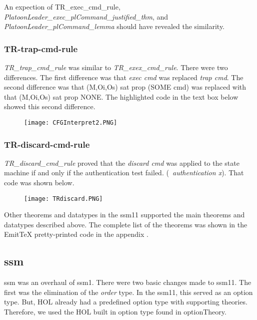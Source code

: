  An expection of TR_exec_cmd_rule, \textit{PlatoonLeader_exec_plCommand_justified_thm},
 and \textit{PlatoonLeader_plCommand_lemma} should have revealed the similarity.\\
 
 
\subsubsection{TR-trap-cmd-rule}
\label{sec:tr-trap-cmd}


  \textit{TR_trap_cmd_rule} was similar to \textit{TR_exex_cmd_rule}.  There were two differences.
  The first difference was that \textit{exec cmd} was replaced \textit{trap cmd}.  The second difference
  was that (M,Oi,Os) sat prop (SOME cmd) was replaced with that (M,Oi,Os) sat prop  NONE.  The
  highlighted code in the text box below showed this second difference.\\
  
  \begin{figure}[h]
  \centering
  \texttt{[image: CFGInterpret2.PNG]}
\end{figure}


\subsubsection{TR-discard-cmd-rule}
\label{sec:tr-discard-cmd}

  \textit{TR_discard_cmd_rule} proved that the \textit{discard cmd} was applied to the state machine
  if and only if the authentication test failed.  (\textit{~authentication x}).  That code was shown below.\\
  
  \begin{figure}[h]
  \centering
  \texttt{[image: TRdiscard.PNG]}
\end{figure}

 Other theorems and datatypes in the ssm11 supported the main theorems and datatypes described above.
  The complete list of the theorems was shown in the EmitTeX pretty-printed code in the appendix .\\


\subsection{ssm}
\label{sec:ssm-1}

 ssm was an overhaul of ssm1.  There were two basic changes made to ssm11.  The first was the
  elimination of the \textit{order} type.  In the ssm11, this served as an option type.  But, HOL
  already had a predefined option type with supporting theories.  Therefore, we used the HOL built
  in option type found in optionTheory.\\
  
